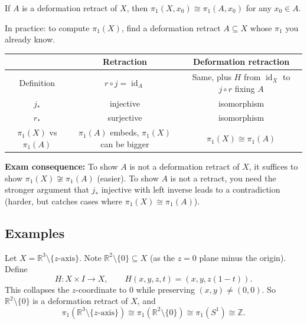 \documentclass[11pt]{report}
\begin{document}
\begin{corbox}
If $A$ is a deformation retract of $X$, then $\pi_1(X, x_0) \cong \pi_1(A, x_0)$ for any $x_0 \in A$.

In practice: to compute $\pi_1(X)$, find a deformation retract $A \subseteq X$ whose $\pi_1$ you already know.
\end{corbox}

\begin{rembox}
\begin{center}
\small
\begin{tabular}{|c|c|c|}
\hline
& \textbf{Retraction} & \textbf{Deformation retraction} \\
\hline
Definition & $r \circ j = \operatorname{id}_A$ & Same, plus $H$ from $\operatorname{id}_X$ to $j \circ r$ fixing $A$ \\
\hline
$j_*$ & injective & isomorphism \\
\hline
$r_*$ & surjective & isomorphism \\
\hline
$\pi_1(X)$ vs $\pi_1(A)$ & $\pi_1(A)$ embeds, $\pi_1(X)$ can be bigger & $\pi_1(X) \cong \pi_1(A)$ \\
\hline
\end{tabular}
\end{center}
\textbf{Exam consequence:} To show $A$ is not a deformation retract of $X$, it suffices to show $\pi_1(X) \not\cong \pi_1(A)$ (easier). To show $A$ is not a retract, you need the stronger argument that $j_*$ injective with left inverse leads to a contradiction (harder, but catches cases where $\pi_1(X) \cong \pi_1(A)$).
\end{rembox}

\subsection{Examples}

\begin{exbox}
Let $X = \mathbb{R}^3 \setminus \{z\text{-axis}\}$. Note $\mathbb{R}^2 \setminus \{0\} \subseteq X$ (as the $z = 0$ plane minus the origin). Define
\[H: X \times I \to X, \qquad H(x, y, z, t) = (x, y, z(1-t)).\]
This collapses the $z$-coordinate to $0$ while preserving $(x, y) \neq (0,0)$. So $\mathbb{R}^2 \setminus \{0\}$ is a deformation retract of $X$, and
\[\pi_1(\mathbb{R}^3 \setminus \{z\text{-axis}\}) \cong \pi_1(\mathbb{R}^2 \setminus \{0\}) \cong \pi_1(S^1) \cong \mathbb{Z}.\]
\end{exbox}
\end{document}
